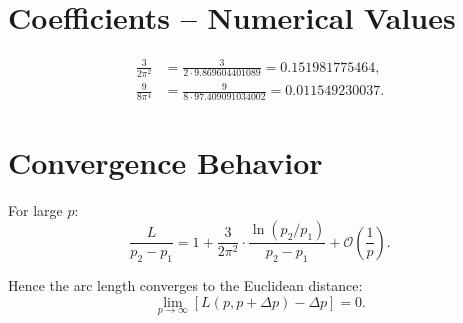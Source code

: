 \section{Coefficients -- Numerical Values}

\begin{align}
\frac{3}{2\pi^2}
&= \frac{3}{2 \cdot 9.869604401089}
= 0.151981775464, \\[6pt]
\frac{9}{8\pi^4}
&= \frac{9}{8 \cdot 97.409091034002}
= 0.011549230037.
\end{align}

\section{Convergence Behavior}

For large $p$:
\[
\frac{L}{p_2 - p_1}
= 1
+ \frac{3}{2\pi^2}
  \cdot \frac{\ln(p_2/p_1)}{p_2 - p_1}
+ \mathcal{O}\!\left(\frac{1}{p}\right).
\]

Hence the arc length converges to the Euclidean distance:
\[
\lim_{p\to\infty} \left[L(p,p+\Delta p) - \Delta p\right] = 0.
\]
